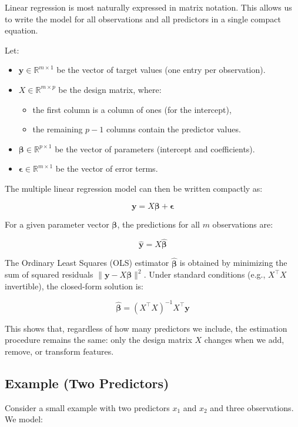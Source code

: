 Linear regression is most naturally expressed in matrix notation. This allows us to write the model for all observations and all predictors in a single compact equation.

Let:
\begin{itemize}
  \item $\mathbf{y} \in \mathbb{R}^{m \times 1}$ be the vector of target values (one entry per observation).
  \item $X \in \mathbb{R}^{m \times p}$ be the design matrix, where:
    \begin{itemize}
      \item the first column is a column of ones (for the intercept),
      \item the remaining $p - 1$ columns contain the predictor values.
    \end{itemize}
  \item $\boldsymbol{\beta} \in \mathbb{R}^{p \times 1}$ be the vector of parameters (intercept and coefficients).
  \item $\boldsymbol{\epsilon} \in \mathbb{R}^{m \times 1}$ be the vector of error terms.
\end{itemize}


The multiple linear regression model can then be written compactly as:

\[
\mathbf{y} = X \boldsymbol{\beta} + \boldsymbol{\epsilon}
\]

For a given parameter vector $\boldsymbol{\beta}$, the predictions for all $m$ observations are:

\[
\hat{\mathbf{y}} = X \hat{\boldsymbol{\beta}}
\]

The Ordinary Least Squares (OLS) estimator $\hat{\boldsymbol{\beta}}$ is obtained by minimizing the sum of squared residuals $\|\mathbf{y} - X\boldsymbol{\beta}\|^2$. Under standard conditions (e.g., $X^\top X$ invertible), the closed-form solution is:

\[
\hat{\boldsymbol{\beta}} = (X^\top X)^{-1} X^\top \mathbf{y}
\]

This shows that, regardless of how many predictors we include, the estimation procedure remains the same: only the design matrix $X$ changes when we add, remove, or transform features.

\subsection{Example (Two Predictors)}

Consider a small example with two predictors $x_1$ and $x_2$ and three observations. We model:

